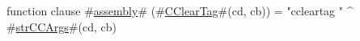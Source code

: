 function clause #\hyperref[sailMIPSzassembly]{assembly}# (#\hyperref[sailMIPSzCClearTag]{CClearTag}#(cd, cb)) = "ccleartag " ^ #\hyperref[sailMIPSzstrCCArgs]{strCCArgs}#(cd, cb)
